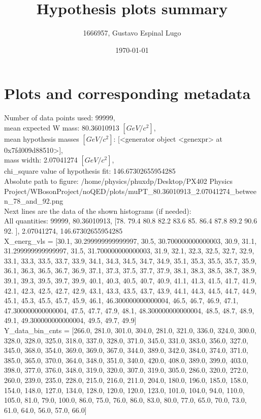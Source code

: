 \documentclass[12pt]{article}
\begin{document}
	\title{Hypothesis plots summary} %
	\author{1666957, Gustavo Espinal Lugo}
	\date{\today} %

	\maketitle
	
	\section*{Plots and corresponding metadata}
	Number of data points used: 99999,\\
mean expected W mass: 80.36010913 $[GeV/c^{2}]$,\\
mean hypothesis masses $[GeV/c^{2}]$: [<generator object <genexpr> at 0x7fd009d88510>],\\
mass width: 2.07041274 $[GeV/c^{2}]$,\\
chi\_square value of hypothesis fit: 146.67302655954285\\
	Absolute path to figure: /home/physics/phuxdp/Desktop/PX402 Physics Project/WBosonProject/noQED/plots/muPT\_80.36010913\_2.07041274\_between\_78\_and\_92.png\\
	Next lines are the data of the shown histograms (if needed): \\
	All quantities: 	99999, 80.36010913, [78.  79.4 80.8 82.2 83.6 85.  86.4 87.8 89.2 90.6 92. ], 2.07041274, 146.67302655954285\\
	X\_energ\_vls = [30.1, 30.299999999999997, 30.5, 30.700000000000003, 30.9, 31.1, 31.299999999999997, 31.5, 31.700000000000003, 31.9, 32.1, 32.3, 32.5, 32.7, 32.9, 33.1, 33.3, 33.5, 33.7, 33.9, 34.1, 34.3, 34.5, 34.7, 34.9, 35.1, 35.3, 35.5, 35.7, 35.9, 36.1, 36.3, 36.5, 36.7, 36.9, 37.1, 37.3, 37.5, 37.7, 37.9, 38.1, 38.3, 38.5, 38.7, 38.9, 39.1, 39.3, 39.5, 39.7, 39.9, 40.1, 40.3, 40.5, 40.7, 40.9, 41.1, 41.3, 41.5, 41.7, 41.9, 42.1, 42.3, 42.5, 42.7, 42.9, 43.1, 43.3, 43.5, 43.7, 43.9, 44.1, 44.3, 44.5, 44.7, 44.9, 45.1, 45.3, 45.5, 45.7, 45.9, 46.1, 46.300000000000004, 46.5, 46.7, 46.9, 47.1, 47.300000000000004, 47.5, 47.7, 47.9, 48.1, 48.300000000000004, 48.5, 48.7, 48.9, 49.1, 49.300000000000004, 49.5, 49.7, 49.9]\\
	Y\_data\_bin\_cnts = [266.0, 281.0, 301.0, 304.0, 281.0, 321.0, 336.0, 324.0, 300.0, 328.0, 328.0, 325.0, 318.0, 337.0, 328.0, 371.0, 345.0, 331.0, 383.0, 356.0, 327.0, 345.0, 368.0, 354.0, 369.0, 369.0, 367.0, 344.0, 389.0, 342.0, 384.0, 374.0, 371.0, 385.0, 365.0, 370.0, 364.0, 348.0, 351.0, 340.0, 420.0, 408.0, 389.0, 399.0, 403.0, 398.0, 377.0, 376.0, 348.0, 319.0, 320.0, 307.0, 319.0, 305.0, 286.0, 320.0, 272.0, 260.0, 239.0, 235.0, 228.0, 215.0, 216.0, 211.0, 204.0, 180.0, 196.0, 185.0, 158.0, 154.0, 148.0, 127.0, 134.0, 128.0, 120.0, 120.0, 123.0, 101.0, 104.0, 94.0, 110.0, 105.0, 81.0, 79.0, 100.0, 86.0, 75.0, 76.0, 86.0, 83.0, 80.0, 77.0, 65.0, 70.0, 73.0, 61.0, 64.0, 56.0, 57.0, 66.0]\\
\end{document}
